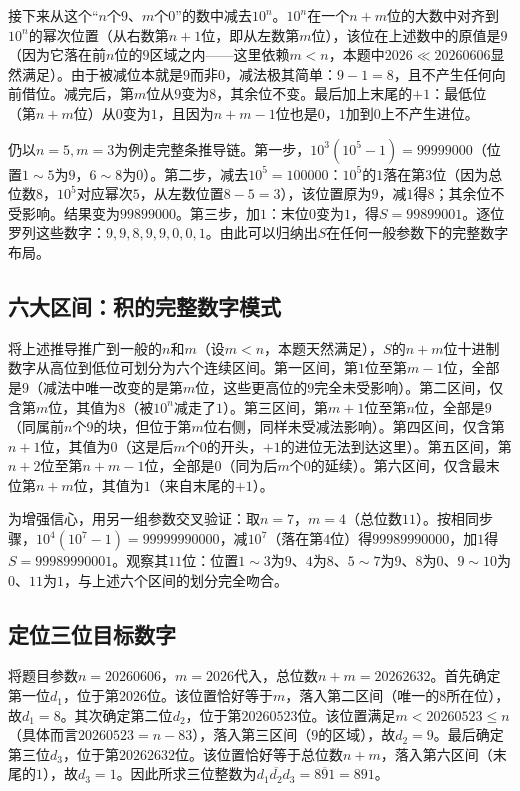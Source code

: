 接下来从这个“$n$个$9$、$m$个$0$”的数中减去$10^n$。$10^n$在一个$n+m$位的大数中对齐到$10^n$的幂次位置（从右数第$n+1$位，即从左数第$m$位），该位在上述数中的原值是$9$（因为它落在前$n$位的$9$区域之内——这里依赖$m < n$，本题中$2026 \ll 20260606$显然满足）。由于被减位本就是$9$而非$0$，减法极其简单：$9 - 1 = 8$，且不产生任何向前借位。减完后，第$m$位从$9$变为$8$，其余位不变。最后加上末尾的$+1$：最低位（第$n+m$位）从$0$变为$1$，且因为$n+m-1$位也是$0$，$1$加到$0$上不产生进位。

仍以$n=5, m=3$为例走完整条推导链。第一步，$10^3(10^5-1) = 99999000$（位置$1\sim 5$为$9$，$6\sim 8$为$0$）。第二步，减去$10^5 = 100000$：$10^5$的$1$落在第$3$位（因为总位数$8$，$10^5$对应幂次$5$，从左数位置$8-5=3$），该位置原为$9$，减$1$得$8$；其余位不受影响。结果变为$99899000$。第三步，加$1$：末位$0$变为$1$，得$S = 99899001$。逐位罗列这些数字：$9, 9, 8, 9, 9, 0, 0, 1$。由此可以归纳出$S$在任何一般参数下的完整数字布局。

\subsection{六大区间：积的完整数字模式}

将上述推导推广到一般的$n$和$m$（设$m < n$，本题天然满足），$S$的$n+m$位十进制数字从高位到低位可划分为六个连续区间。第一区间，第$1$位至第$m-1$位，全部是$9$（减法中唯一改变的是第$m$位，这些更高位的$9$完全未受影响）。第二区间，仅含第$m$位，其值为$8$（被$10^n$减走了$1$）。第三区间，第$m+1$位至第$n$位，全部是$9$（同属前$n$个$9$的块，但位于第$m$位右侧，同样未受减法影响）。第四区间，仅含第$n+1$位，其值为$0$（这是后$m$个$0$的开头，$+1$的进位无法到达这里）。第五区间，第$n+2$位至第$n+m-1$位，全部是$0$（同为后$m$个$0$的延续）。第六区间，仅含最末位第$n+m$位，其值为$1$（来自末尾的$+1$）。

为增强信心，用另一组参数交叉验证：取$n = 7$，$m = 4$（总位数$11$）。按相同步骤，$10^4(10^7-1) = 99999990000$，减$10^7$（落在第$4$位）得$99989990000$，加$1$得$S = 99989990001$。观察其$11$位：位置$1\sim 3$为$9$、$4$为$8$、$5\sim 7$为$9$、$8$为$0$、$9\sim 10$为$0$、$11$为$1$，与上述六个区间的划分完全吻合。

\subsection{定位三位目标数字}

将题目参数$n = 20260606$，$m = 2026$代入，总位数$n+m = 20262632$。首先确定第一位$d_1$，位于第$2026$位。该位置恰好等于$m$，落入第二区间（唯一的$8$所在位），故$d_1 = 8$。其次确定第二位$d_2$，位于第$20260523$位。该位置满足$m < 20260523 \le n$（具体而言$20260523 = n - 83$），落入第三区间（$9$的区域），故$d_2 = 9$。最后确定第三位$d_3$，位于第$20262632$位。该位置恰好等于总位数$n+m$，落入第六区间（末尾的$1$），故$d_3 = 1$。因此所求三位整数为$\overline{d_1 d_2 d_3} = \overline{891} = 891$。

